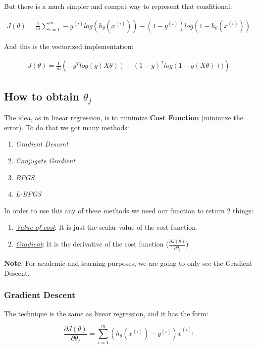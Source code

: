 \noindent But there is a much simpler and compat way to represent that conditional:

\begin{align}
	J(\theta) = \frac{1}{m} \sum_{i=1}^{m} -y^{(i)}log(h_{\theta}(x^{(i)})) - (1-y^{(i)})log(1 - h_{\theta}(x^{(i)}))
\end{align}

\noindent And this is the vectorized implementation:

\begin{align}
	J(\theta) = \frac{1}{m} \left(-y^Tlog(g(X\theta)) - (1 - y)^Tlog(1 - g(X\theta)))\right)
\end{align}

\subsection{How to obtain $\theta_{j}$}
The idea, as in linear regression, is to minimize \textbf{Cost Function} (minimize the error). To do that we got many methods:

\begin{enumerate}[label=\textbullet]
	\item \textit{Gradient Descent}
	\item \textit{Conjugate Gradient}
	\item \textit{BFGS}
	\item \textit{L-BFGS}
\end{enumerate}

\noindent In order to use this any of these methods we need our function to return 2 things:

\begin{enumerate}[label=\arabic*.]
	\item \underline{\textit{Value of cost}}: It is just the scalar value of the cost function.
	\item \underline{\textit{Gradient}}: It is the derivative of the cost function ($\frac{\partial{J(\theta)}}{\partial{\theta_j}}$)
\end{enumerate}


\noindent \textbf{Note}: For academic and learning purposes, we are going to only see the Gradient Descent.

\subsubsection{Gradient Descent}
The technique is the same as linear regression, and it has the form:

$$\frac{\partial{J(\theta)}}{\partial{\theta_j}} = \sum^{m}_{i=1}(h_{\theta}(x^{(i)}) - y^{(i)})x^{(i)_j}$$

